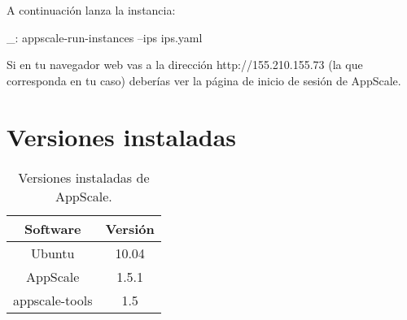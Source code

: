 A continuación lanza la instancia:

\begin{bashcode}
_: appscale-run-instances --ips ips.yaml
\end{bashcode}

Si en tu navegador web vas a la dirección http://155.210.155.73 (la que corresponda en tu caso) deberías ver la página de inicio de sesión de AppScale.


\section{Versiones instaladas}

\begin{table}[!htbp]
\centering
   \begin{tabular}{|c|c|}
      \hline
      \textbf{Software} & \textbf{Versión} \\ \hline
      Ubuntu & 10.04 \\ \hline
      AppScale & 1.5.1 \\ \hline
      appscale-tools & 1.5 \\ \hline
   \end{tabular}
\caption{Versiones instaladas de AppScale.}
\label{table:puppet-versions}
\end{table}
